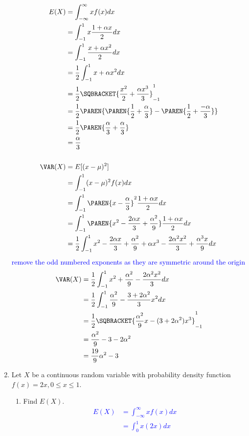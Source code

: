 \documentclass[10pt,a4paper]{report}
\newcommand{\BLUE}[1]{\textcolor{blue}{#1}}
\begin{document}
\begin{enumerate}
	\BLUE{\begin{align*}
		E(X) &= \int_{-\infty}^\infty xf(x) dx \\
		&= \int_{-1}^1 x\frac{1+\alpha x}{2}dx \\
		&= \int_{-1}^1 \frac{x+\alpha x^2}{2}dx \\
		&= \frac{1}{2}\int_{-1}^1 x+\alpha x^2dx \\
		&= \frac{1}{2}\SQBRACKET{\frac{x^2}{2} + \frac{\alpha x^3}{3}}_{-1}^1 \\
		&= \frac{1}{2}\PAREN{\PAREN{\frac{1}{2} + \frac{\alpha}{3}}-\PAREN{\frac{1}{2} + \frac{-\alpha}{3}}} \\
		&= \frac{1}{2}\PAREN{\frac{\alpha}{3}+\frac{\alpha}{3}} \\
		&= \frac{\alpha}{3} \\
		\\
		\VAR(X) &= E[(x - \mu)^2]\\
		&=  \int_{-1}^1 (x - \mu)^2f(x)dx \\
		&=  \int_{-1}^1 \PAREN{x - \frac{\alpha}{3}}^2\frac{1+\alpha x}{2}dx \\
		&=  \int_{-1}^1 \PAREN{x^2-\frac{2\alpha x}{3} + \frac{\alpha^2}{9}}\frac{1+\alpha x}{2}dx \\
		&=  \frac{1}{2}\int_{-1}^1 x^2-\frac{2\alpha x}{3} + \frac{\alpha^2}{9} + \alpha x^3-\frac{2\alpha^2 x^2}{3} + \frac{\alpha^3 x}{9} dx 
	\end{align*}remove the odd numbered exponents as they are symmetric around the origin
	\begin{align*}
		\VAR(X) &=  \frac{1}{2}\int_{-1}^1 x^2 + \frac{\alpha^2}{9} -\frac{2\alpha^2 x^2}{3} dx \\
		&=  \frac{1}{2}\int_{-1}^1 \frac{\alpha^2}{9} -\frac{3+2\alpha^2}{3}x^2 dx \\
		&=  \frac{1}{2}\SQBRACKET{\frac{\alpha^2}{9}x-(3+2\alpha^2)x^3}_{-1}^1 \\
		&= \frac{\alpha^2}{9}-3-2\alpha^2 \\
		&= \frac{19}{9}\alpha^2-3
	\end{align*}
	}
	\item Let $X$ be a continuous random variable with probability density function $f(x) = 2x, 0\le x \le 1$.
	\begin{enumerate}
		\item Find $E(X)$.
		\BLUE{\begin{align*}
			E(X) &= \int_{-\infty}^\infty  xf(x)dx \\
			&=  \int_{0}^1  x(2x)dx \\

\end{align*}}
\end{enumerate}
\end{enumerate}
\end{document}
